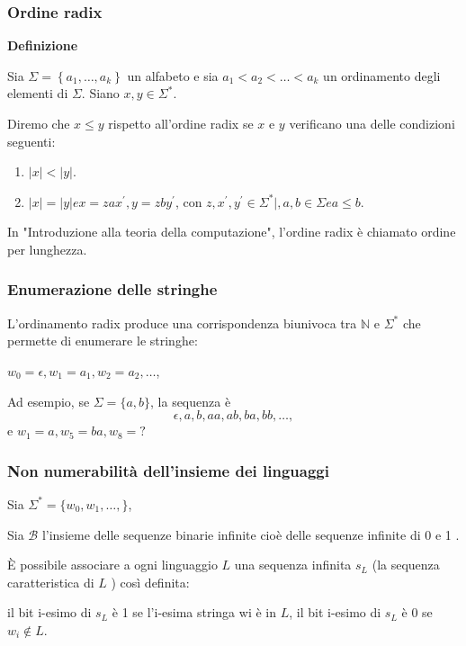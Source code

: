 \subsubsection{Ordine radix}

\textbf{Definizione}

Sia $\Sigma=\left\{a_{1}, \ldots, a_{k}\right\}$ un alfabeto e sia $a_{1}<a_{2}<\ldots<a_{k}$ un ordinamento degli elementi di $\Sigma$. Siano $x, y \in \Sigma^{*}$.

Diremo che $x \leq y$ rispetto all'ordine radix se $x$ e $y$ verificano una delle condizioni seguenti:
\begin{enumerate}
    \item $|x|<|y|$.
    \item $|x|=|y| e x=z a x^{\prime}, y=z b y^{\prime}$, con $z, x^{\prime}, y^{\prime} \in \Sigma^{*} \mid, a, b \in \Sigma e a \leq b$.
\end{enumerate}

In "Introduzione alla teoria della computazione", l'ordine radix è chiamato ordine per lunghezza.

\subsubsection{Enumerazione delle stringhe}

L'ordinamento radix produce una corrispondenza biunivoca tra $\mathbb{N}$ e $\Sigma^{*}$ che permette di enumerare le stringhe:

$w_{0}=\epsilon, w_{1}=a_{1}, w_{2}=a_{2}, \ldots$,

Ad esempio, se $\Sigma=\{a, b\}$, la sequenza è
$$
\epsilon, a, b, a a, a b, b a, b b, \ldots,
$$
e $w_{1}=a, w_{5}=b a, w_{8}=?$

\subsubsection{Non numerabilità dell'insieme dei linguaggi}

Sia $\Sigma^{*}=\{w_{0}, w_{1}, \ldots,\}$,

Sia $\mathcal{B}$ l'insieme delle sequenze binarie infinite cioè delle sequenze infinite di 0 e 1 .

È possibile associare a ogni linguaggio $L$ una sequenza infinita $s_{L}$ (la sequenza caratteristica di $L$ ) così definita:

\vspace{5mm}


\begin{center}
    il bit i-esimo di $s_{L}$ è 1 se l'i-esima stringa wi è in $L$, il bit i-esimo di $s_{L}$ è 0 se $w_{i} \notin L$.
\end{center}


